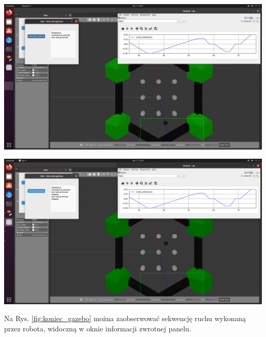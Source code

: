 \begin{center}
    \includegraphics[width=1\linewidth]{files/ruch.png}
    \label{fig:ruch_gazebo}
\end{center}

\begin{center}
    \includegraphics[width=1\linewidth]{files/koniec.png}
    \label{fig:koniec_gazebo}
\end{center}

Na Rys. \ref{fig:koniec_gazebo} można zaobserwować sekwencję ruchu wykonaną przez robota, widoczną w oknie informacji zwrotnej panelu. 

